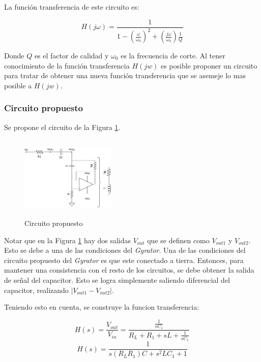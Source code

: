La función transferencia de este circuito es:

\begin{equation} H(j\omega) = \frac{1}{1 - (\frac{\omega}{\omega_0})^{2} + (\frac{j\omega}{\omega_0})\frac{1}{Q}} \label{equ:trans_clasica_br}\end{equation}  

Donde $Q$ es el factor de calidad y $\omega_0$ es la frecuencia de corte.      
Al tener conocimiento de la función transferencia $H(jw)$ es posible proponer un circuito para tratar de obtener una nueva función transferencia que se asemeje lo mas posible a $H(jw)$. 

\subsubsection{Circuito propuesto}
Se propone el circuito de la Figura \ref{fig:ej2_LP_propuesto}. 

\begin{figure}[!]                                                       
\centering\includegraphics[width=0.4\textwidth, height=4cm]{../Ex2/Resources/ej2_lp_gyrator.png}
\caption{Circuito propuesto}
\label{fig:ej2_LP_propuesto}
\end{figure}


Notar que en la Figura  \ref{fig:ej2_LP_propuesto} hay dos salidas $V_{out}$ que se definen como $V_{out1}$ y $V_{out2}$. Esto se debe a  una de las condiciones del \textit{Gyrator}. Una de las condiciones del circuito propuesto del \textit{Gyrator} es que este conectado a tierra. Entonces, para mantener una consistencia con el resto de los circuitos, se debe obtener la salida de señal del capacitor. Esto se logra simplemente saliendo diferencial del capacitor, realizando $|V_{out1} - V_{out2}|$. 

Teniendo esto en cuenta, se construye la funcion transferencia:

\begin{displaymath} H(s)= \frac{V_{out}}{V_{in}} = \frac{\frac{1}{sC_1}}{R_L + R_1 +sL + \frac{1}{sC_1}} \end{displaymath}  
\begin{displaymath} H(s)= \frac{1}{s (R_L R_1)C + s^2LC_1 + 1} \end{displaymath}

